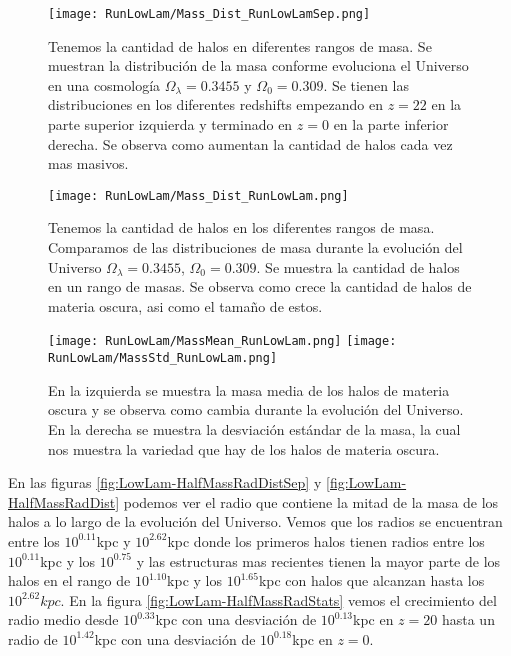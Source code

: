 \begin{figure}[H]
    \centering
    \texttt{[image: RunLowLam/Mass\_Dist\_RunLowLamSep.png]}
    \caption[Distribución de masa]{\footnotesize Tenemos la cantidad de halos en diferentes rangos de masa. Se muestran la distribución de la masa conforme evoluciona el Universo en una cosmología $\Omega_\lambda = 0.3455$ y $\Omega_0 = 0.309$. Se tienen las distribuciones en los diferentes redshifts empezando en $z=22$ en la parte superior izquierda y terminado en $z=0$ en la parte inferior derecha. Se observa como aumentan la cantidad de halos cada vez mas masivos.}
    \label{fig:LowLam-MassDistSep}
\end{figure}

\begin{figure}[H]
    \centering
    \texttt{[image: RunLowLam/Mass\_Dist\_RunLowLam.png]}
    \caption[Comparación de distribución de masa]{\footnotesize Tenemos la cantidad de halos en los diferentes rangos de masa. Comparamos de las distribuciones de masa durante la evolución del Universo $\Omega_\lambda = 0.3455$, $\Omega_0 = 0.309$. Se muestra la cantidad de halos en un rango de masas. Se observa como crece la cantidad de halos de materia oscura, asi como el tamaño de estos.}
    \label{fig:LowLam-MassDist}
\end{figure}

\begin{figure}[H]
    \centering
    \texttt{[image: RunLowLam/MassMean\_RunLowLam.png]}
    \texttt{[image: RunLowLam/MassStd\_RunLowLam.png]}
    \caption[Media y desviación estándar de la distribución de masa]{\footnotesize En la izquierda se muestra la masa media de los halos de materia oscura y se observa como cambia durante la evolución del Universo. En la derecha se muestra la desviación estándar de la masa, la cual nos muestra la variedad que hay de los halos de materia oscura.}
    \label{fig:LowLam-MassStats}
\end{figure}

En las figuras \ref{fig:LowLam-HalfMassRadDistSep} y \ref{fig:LowLam-HalfMassRadDist} podemos ver el radio que contiene la mitad de la masa de los halos a lo largo de la evolución del Universo. Vemos que los radios se encuentran entre los $10^{0.11}$kpc y $10^{2.62}$kpc donde los primeros halos tienen radios entre los $10^{0.11}$kpc y los $10^{0.75}$ y las estructuras mas recientes tienen la mayor parte de los halos en el rango de $10^{1.10}$kpc y los $10^{1.65}$kpc con halos que alcanzan hasta los $10^{2.62}kpc$. En la figura \ref{fig:LowLam-HalfMassRadStats} vemos el crecimiento del radio medio desde $10^{0.33}$kpc con una desviación de $10^{0.13}$kpc en $z=20$ hasta un radio de $10^{1.42}$kpc con una desviación de $10^{0.18}$kpc en $z=0$.

